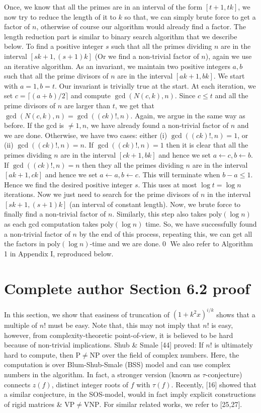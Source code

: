\documentclass[10pt,a4paper]{article}
\begin{document}
Once, we know that all the primes are in an interval of the form $[t+1,tk]$, we now try to reduce the length of it to $k$ so that, we can simply brute force to get a factor of $n$, otherwise of course our algorithm would already find a factor. The length reduction part is similar to binary search algorithm that we describe below.
To find a positive integer $s$ such that all the primes dividing $n$ are in the interval $[sk+1,(s+1)k]$ (Or we find a non-trivial factor of $n$), again we use an iterative algorithm. As an invariant, we maintain two positive integers $a,b$ such that all the prime divisors of $n$ are in the interval $[ak+1,bk]$. We start with $a=1,b=t$. Our invariant is trivially true at the start.
At each iteration, we set $c=\lceil(a+b)/2\rceil$ and compute $\gcd(N(c,k),n)$. Since $c\le t$ and all the prime divisors of $n$ are larger than $t$, we get that $\gcd(N(c,k),n)=\gcd((ck)!,n)$. Again, we argue in the same way as before. If the gcd is $\ne1,n$, we have already found a non-trivial factor of $n$ and we are done. Otherwise, we have two cases: either (i) $\gcd((ck)!,n)=1$, or (ii) $\gcd((ck)!,n)=n$.
If $\gcd((ck)!,n)=1$ then it is clear that all the primes dividing $n$ are in the interval $[ck+1,bk]$ and hence we set $a\leftarrow c,b\leftarrow b$. If $\gcd((ck)!,n)=n$ then they all the primes dividing $n$ are in the interval $[ak+1,ck]$ and hence we set $a\leftarrow a,b\leftarrow c$. This will terminate when $b-a\le1$. Hence we find the desired positive integer $s$. This uses at most $\log t=\log n$ iterations.
Now we just need to search for the prime divisors of $n$ in the interval $[sk+1,(s+1)k]$ (an interval of constant length). Now, we brute force to finally find a non-trivial factor of $n$. Similarly, this step also takes $\mathrm{poly}(\log n)$ as each gcd computation takes $\mathrm{poly}(\log n)$ time. So, we have successfully found a non-trivial factor of $n$ by the end of this process, repeating this, we can get all the factors in $\mathrm{poly}(\log n)$-time and we are done.\qed
We also refer to Algorithm 1 in Appendix I, reproduced below.
\section*{Complete author Section 6.2 proof}
In this section, we show that easiness of truncation of $(1+k^2x)^{i/k}$ shows that a multiple of $n!$ must be easy. Note that, this may not imply that $n!$ is easy, however, from complexity-theoretic point-of-view, it is believed to be hard because of non-trivial implications. Shub \& Smale [44] proved: If $n!$ is ultimately hard to compute, then $\mathrm P\ne\mathrm{NP}$ over the field of complex numbers. Here, the computation is over Blum-Shub-Smale (BSS) model and can use complex numbers in the algorithm. In fact, a stronger version (known as $\tau$-conjecture) connects $z(f)$, distinct integer roots of $f$ with $\tau(f)$. Recently, [16] showed that a similar conjecture, in the SOS-model, would in fact imply explicit constructions of rigid matrices \& $\mathrm{VP}\ne\mathrm{VNP}$. For similar related works, we refer to [25,27].
\end{document}
